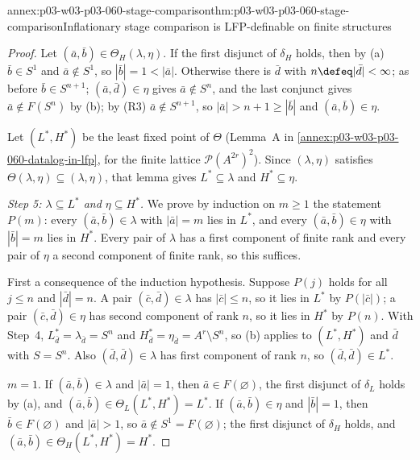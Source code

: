 \begin{annexitem}{annex:p03-w03-p03-060-stage-comparison}{thm:p03-w03-p03-060-stage-comparison}{Inflationary stage comparison is LFP-definable on finite structures}
\begin{proof}
Let \((\bar a,\bar b)\in\Theta_H(\lambda,\eta)\). If the first disjunct of
\(\delta_H\) holds, then by (a) \(\bar b\in S^1\) and \(\bar a\notin S^1\),
so \(|\bar b|=1<|\bar a|\). Otherwise there is \(\bar d\) with
\(n\defeq|\bar d|<\infty\); as before \(\bar b\in S^{n+1}\);
\((\bar a,\bar d)\in\eta\) gives \(\bar a\notin S^n\), and the last
conjunct gives \(\bar a\notin F(S^n)\) by (b); by (R3)
\(\bar a\notin S^{n+1}\), so \(|\bar a|>n+1\ge|\bar b|\) and
\((\bar a,\bar b)\in\eta\).

Let \((L^\ast,H^\ast)\) be the least fixed point of \(\Theta\) (Lemma~A in
\cref{annex:p03-w03-p03-060-datalog-in-lfp}, for the finite lattice
\(\mathcal P(A^{2r})^2\)). Since \((\lambda,\eta)\) satisfies
\(\Theta(\lambda,\eta)\subseteq(\lambda,\eta)\), that lemma gives
\(L^\ast\subseteq\lambda\) and \(H^\ast\subseteq\eta\).

\emph{Step 5: \(\lambda\subseteq L^\ast\) and \(\eta\subseteq H^\ast\).} We
prove by induction on \(m\ge1\) the statement \(P(m)\): every
\((\bar a,\bar b)\in\lambda\) with \(|\bar a|=m\) lies in \(L^\ast\), and
every \((\bar a,\bar b)\in\eta\) with \(|\bar b|=m\) lies in \(H^\ast\).
Every pair of \(\lambda\) has a first component of finite rank and every
pair of \(\eta\) a second component of finite rank, so this suffices.

First a consequence of the induction hypothesis. Suppose \(P(j)\) holds for
all \(j\le n\) and \(|\bar d|=n\). A pair \((\bar c,\bar d)\in\lambda\) has
\(|\bar c|\le n\), so it lies in \(L^\ast\) by \(P(|\bar c|)\); a pair
\((\bar c,\bar d)\in\eta\) has second component of rank \(n\), so it lies
in \(H^\ast\) by \(P(n)\). With Step~4,
\(L^\ast_{\bar d}=\lambda_{\bar d}=S^n\) and
\(H^\ast_{\bar d}=\eta_{\bar d}=A^r\setminus S^n\), so (b) applies to
\((L^\ast,H^\ast)\) and \(\bar d\) with \(S=S^n\). Also
\((\bar d,\bar d)\in\lambda\) has first component of rank \(n\), so
\((\bar d,\bar d)\in L^\ast\).

\(m=1\). If \((\bar a,\bar b)\in\lambda\) and \(|\bar a|=1\), then
\(\bar a\in F(\varnothing)\), the first disjunct of \(\delta_L\) holds by
(a), and \((\bar a,\bar b)\in\Theta_L(L^\ast,H^\ast)=L^\ast\). If
\((\bar a,\bar b)\in\eta\) and \(|\bar b|=1\), then
\(\bar b\in F(\varnothing)\) and \(|\bar a|>1\), so
\(\bar a\notin S^1=F(\varnothing)\); the first disjunct of \(\delta_H\)
holds, and \((\bar a,\bar b)\in\Theta_H(L^\ast,H^\ast)=H^\ast\).


\end{proof}
\end{annexitem}
